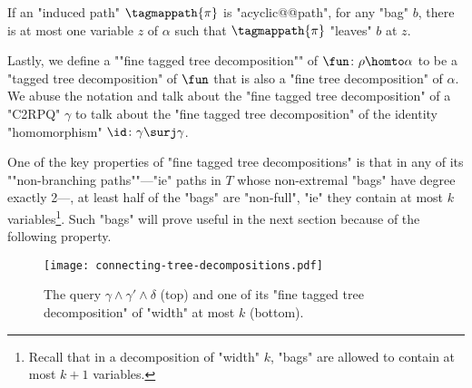 \begin{fact}
	\AP\label{fact:acyclic-decomposition-leave-forever}
	If an "induced path" $\tagmappath{\pi}$ is "acyclic@@path", for any "bag" $b$,
	there is at most one variable $z$ of $\alpha$ such that $\tagmappath{\pi}$
	"leaves" $b$ at $z$.
\end{fact}

\AP Lastly, we define a ""fine tagged tree decomposition"" of $\fun\colon \rho \homto \alpha$
to be a "tagged tree decomposition" of $\fun$ that is also a "fine tree decomposition" of $\alpha$.
We abuse the notation and talk about the "fine tagged tree decomposition" of a "C2RPQ" $\gamma$
to talk about the "fine tagged tree decomposition" of the identity "homomorphism"
$\id\colon \gamma \surj \gamma$.

\AP One of the key properties of "fine tagged tree decompositions" is that in any of its ""non-branching paths""---"ie" paths in $T$ whose non-extremal "bags" have degree exactly 2---, at least half of the "bags" are "non-full", "ie" they
contain at most $k$ variables\footnote{Recall 
that in a decomposition of "width" $k$, "bags" are allowed to contain at most $k+1$ variables.}.
Such "bags" will prove useful in the next section because of the following property.

\begin{figure}
    \centering
    \texttt{[image: connecting-tree-decompositions.pdf]}
    \caption{%
        \AP\label{fig:connecting-tree-decompositions} The query
        $\gamma \land \gamma' \land \delta$ (top)
        and one of its "fine tagged tree decomposition"
		of "width" at most $k$ (bottom).
    }
\end{figure}

